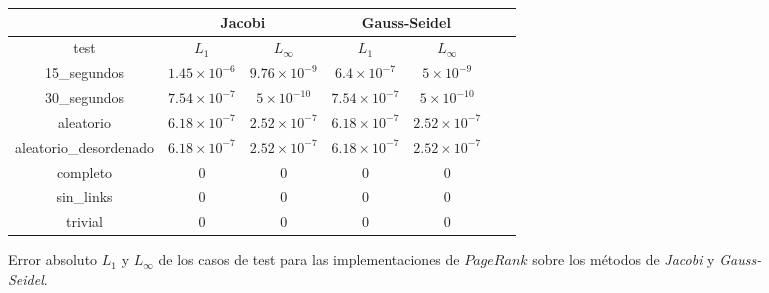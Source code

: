 \vspace{1em}
\begin{figure}[!htbp]
        \begin{tabular}{ |c|c|c|c|c|c|c| } 
        \hline
                                & \multicolumn{2}{c|}{Jacobi}    & \multicolumn{2}{c|}{Gauss-Seidel} \\
        \hline
        test                    & $L_1$             & $L_{\infty}$      & $L_1$     & $L_{\infty}$ \\
        \hline
        15\_segundos            & $1.45 \times 10^{-6}$  & $9.76 \times 10^{-9}$  & $6.4 \times 10^{-7}$  & $5 \times 10^{-9}$ \\
        30\_segundos            & $7.54 \times 10^{-7}$  & $5 \times 10^{-10}$  & $7.54 \times 10^{-7}$  & $5 \times 10^{-10}$ \\
        aleatorio               & $6.18 \times 10^{-7}$  & $2.52 \times 10^{-7}$  & $6.18 \times 10^{-7}$  & $2.52 \times 10^{-7}$ \\
        aleatorio\_desordenado   & $6.18 \times 10^{-7}$  & $2.52 \times 10^{-7}$  & $6.18 \times 10^{-7}$  & $2.52 \times 10^{-7}$ \\
        completo                & $0$  & $0$  & $0$  & $0$ \\
        sin\_links              & $0$  & $0$  & $0$  & $0$ \\
        trivial                 & $0$  & $0$  & $0$  & $0$ \\
        \hline                  
        \end{tabular}       
    \bigskip
    \caption{Error absoluto $L_1$ y $L_{\infty}$ de los casos de test para las implementaciones de $PageRank$ sobre los métodos de \textit{Jacobi} y \textit{Gauss-Seidel}.} \label{convergencia_resultados}
\end{figure}
